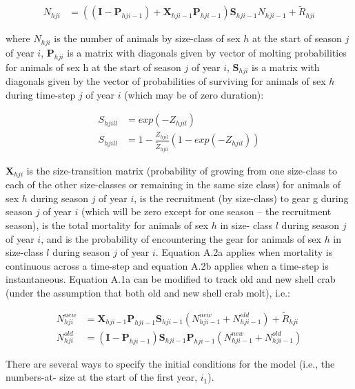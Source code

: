 \documentclass[]{article}
\begin{document}
\begin{align}
N_{hji} &= \left( \left( \textbf{I}-\textbf{P}_{hji-1} \right) + \textbf{X}_{hji-1} \textbf{P}_{hji-1} \right) \textbf{S}_{hji-1} N_{hji-1} + \widetilde{R}_{hji}   
\end{align}

where \(N_{hji}\) is the number of animals by size-class of sex \(h\) at
the start of season \(j\) of year \(i\), \(\textbf{P}_{hji}\) is a
matrix with diagonals given by vector of molting probabilities for
animals of sex h at the start of season \(j\) of year \(i\),
\(\textbf{S}_{hji}\) is a matrix with diagonals given by the vector of
probabilities of surviving for animals of sex \(h\) during time-step
\(j\) of year \(i\) (which may be of zero duration):

\begin{align}
S_{hjill} &= exp\left(-Z_{hjil} \right) \\ 
S_{hjill} &= 1-\frac{Z_{hjil}}{\widetilde{Z}_{hjil}  } \left(1- exp\left(-Z_{hjil} \right) \right) 
\end{align}

\(\textbf{X}_{hji}\) is the size-transition matrix (probability of
growing from one size-class to each of the other size-classes or
remaining in the same size class) for animals of sex \(h\) during season
\(j\) of year \(i\), is the recruitment (by size-class) to gear g during
season \(j\) of year \(i\) (which will be zero except for one season --
the recruitment season), is the total mortality for animals of sex \(h\)
in size- class \(l\) during season \(j\) of year \(i\), and is the
probability of encountering the gear for animals of sex \(h\) in
size-class \(l\) during season \(j\) of year \(i\). Equation A.2a
applies when mortality is continuous across a time-step and equation
A.2b applies when a time-step is instantaneous. Equation A.1a can be
modified to track old and new shell crab (under the assumption that both
old and new shell crab molt), i.e.:

\begin{align}
N^{new}_{hji} &= \textbf{X}_{hji-1}\textbf{P}_{hji-1}  \textbf{S}_{hji-1} \left(  N^{new}_{hji-1} + N^{old}_{hji-1} \right) +  \widetilde{R}_{hji}   \\
N^{old}_{hji} &= \left( \textbf{I}-\textbf{P}_{hji-1}\right)  \textbf{S}_{hji-1}\textbf{P}_{hji-1}  \left(  N^{new}_{hji-1} + N^{old}_{hji-1} \right) 
\end{align}

There are several ways to specify the initial conditions for the model
(i.e., the numbers-at- size at the start of the first year, \(i_{1}\)).
\end{document}
